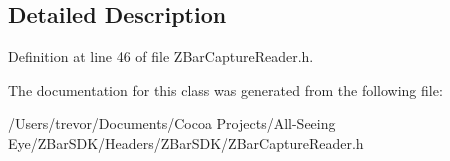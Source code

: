 \subsection{Detailed Description}


Definition at line 46 of file ZBarCaptureReader.h.



The documentation for this class was generated from the following file:\begin{DoxyCompactItemize}
\item 
/Users/trevor/Documents/Cocoa Projects/All-\/Seeing Eye/ZBarSDK/Headers/ZBarSDK/ZBarCaptureReader.h\end{DoxyCompactItemize}
